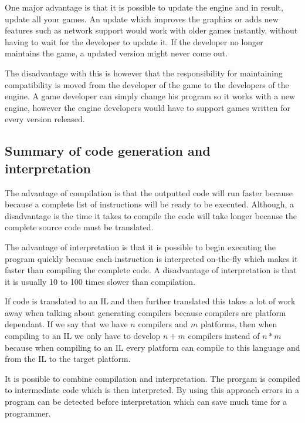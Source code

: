 One major advantage is that it is possible to update the engine and in result,
update all your games.  An update which improves the graphics or adds new
features such as network support would work with older games instantly, without
having to wait for the developer to update it.  If the developer no longer
maintains the game, a updated version might never come out.

The disadvantage with this is however that the responsibility for maintaining
compatibility is moved from the developer of the game to the developers of the
engine. A game developer can simply change his program so it works with a new
engine, however the engine developers would have to support games written for
every version released.

\subsection{Summary of code generation and interpretation}
The advantage of compilation is that the outputted code will run faster because
because a complete list of instructions will be ready to be executed. Although,
a disadvantage is the time it takes to compile the code will take longer because
the complete source code must be translated.

The advantage of interpretation is that it is possible to begin executing the
program quickly because each instruction is interpreted on-the-fly which makes
it faster than compiling the complete code. A disadvantage of interpretation is
that it is usually 10 to 100 times slower than compilation.

If code is translated to an IL and then further translated this takes a lot of
work away when talking about generating compilers because compilers are platform
dependant. If we say that we have $n$ compilers and $m$ platforms, then when
compiling to an IL we only have to develop $n+m$ compilers instead of $n*m$
because when compiling to an IL every platform can compile to this language and
from the IL to the target platform.

It is possible to combine compilation and interpretation. The prorgam is
compiled to intermediate code which is then interpreted. By using this approach
errors in a program can be detected before interpretation which can save much
time for a programmer.
